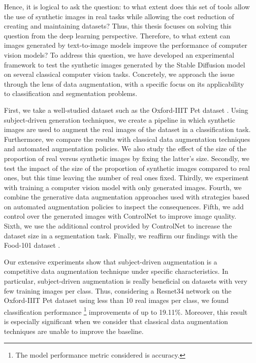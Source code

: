 Hence, it is logical to ask the question: to what extent does this set of tools allow the use of synthetic images in real tasks while allowing the cost reduction of creating and maintaining datasets? Thus, this thesis focuses on solving this question from the deep learning perspective. Therefore, to what extent can images generated by text-to-image models improve the performance of computer vision models? To address this question, we have developed an experimental framework to test the synthetic images generated by the Stable Diffusion model on several classical computer vision tasks. Concretely, we approach the issue through the lens of data augmentation, with a specific focus on its applicability to classification and segmentation problems.

First, we take a well-studied dataset such as the Oxford-IIIT Pet dataset \cite{Parkhi2012CatsAD}. Using subject-driven generation techniques, we create a pipeline in which synthetic images are used to augment the real images of the dataset in a classification task. Furthermore, we compare the results with classical data augmentation techniques and automated augmentation policies. We also study the effect of the size of the proportion of real versus synthetic images by fixing the latter's size. Secondly, we test the impact of the size of the proportion of synthetic images compared to real ones, but this time leaving the number of real ones fixed. Thirdly, we experiment with training a computer vision model with only generated images. Fourth, we combine the generative data augmentation approaches used with strategies based on automated augmentation policies to inspect the consequences. Fifth, we add control over the generated images with ControlNet to improve image quality. Sixth, we use the additional control provided by ControlNet to increase the dataset size in a segmentation task. Finally, we reaffirm our findings with the Food-101 dataset \cite{bossard14}.

Our extensive experiments show that subject-driven augmentation is a competitive data augmentation technique under specific characteristics. In particular, subject-driven augmentation is really beneficial on datasets with very few training images per class. Thus, considering a Resnet34 network on the Oxford-IIIT Pet dataset using less than 10 real images per class, we found classification performance \footnote{The model performance metric considered is accuracy.} improvements of up to 19.11\%. Moreover, this result is especially significant when we consider that classical data augmentation techniques are unable to improve the baseline. 

